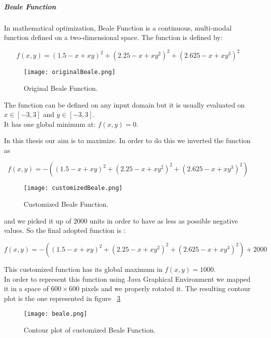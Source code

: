 \subparagraph{Beale Function} In mathematical optimization, Beale Function is a continuous, multi-modal function defined on a two-dimensional space. The function is defined by: 

\begin{equation}
f(x, y) = (1.5 - x + xy)^2 + (2.25 - x + xy^2)^2 + (2.625 - x + xy^3)^2
\end{equation}

\break

\begin{figure}[h!]
	\centering
	\texttt{[image: originalBeale.png]}
	\caption{Original Beale Function.}
	\label{fig:OriginalBealeFunction}
\end{figure}

The function can be defined on any input domain but it is usually evaluated on $x \in [-3, 3]$ and $y \in [-3, 3]$. \\

It has one global minimum at: $f(x, y) = 0$. 

In this thesis our aim is to maximize. In order to do this we inverted the function as

\begin{equation}
f(x, y) = -((1.5 - x + xy)^2 + (2.25 - x + xy^2)^2 + (2.625 - x + xy^3)^2)
\end{equation}

\begin{figure}[h!]
	\centering
	\texttt{[image: customizedBeale.png]}
	\caption{Customized Beale Function.}
	\label{fig:CustomizedBealeFunction}
\end{figure}

and we picked it up of $2000$ units in order to have as less as possible negative values. So the final adopted function is :

\begin{equation}
f(x, y) = -((1.5 - x + xy)^2 + (2.25 - x + xy^2)^2 + (2.625 - x + xy^3)^2) + 2000
\end{equation}

This customized function has its global maximum in $f(x, y) = 1000$. \\

In order to represent this function using Java Graphical Environment we mapped it in a space of $600 \times 600$ pixels and we properly rotated it. The resulting contour plot is the one represented in figure ~\ref{fig:ContourPlotCustomizedBealeFunction} 

\begin{figure}[h!]
	\centering
	\texttt{[image: beale.png]}
	\caption{Contour plot of customized Beale Function.}
	\label{fig:ContourPlotCustomizedBealeFunction}
\end{figure}

